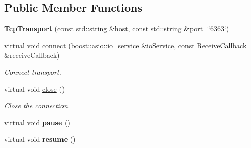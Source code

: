 \subsection*{Public Member Functions}
\begin{DoxyCompactItemize}
\item 
{\bfseries Tcp\+Transport} (const std\+::string \&host, const std\+::string \&port=\char`\"{}6363\char`\"{})\hypertarget{classndn_1_1TcpTransport_a1f88e912c3ced924c37390d25ef7d8a8}{}\label{classndn_1_1TcpTransport_a1f88e912c3ced924c37390d25ef7d8a8}

\item 
virtual void \hyperlink{classndn_1_1TcpTransport_ad8f8e670980297f940d9b73b4d0ae0df}{connect} (boost\+::asio\+::io\+\_\+service \&io\+Service, const Receive\+Callback \&receive\+Callback)
\begin{DoxyCompactList}\small\item\em Connect transport. \end{DoxyCompactList}\item 
virtual void \hyperlink{classndn_1_1TcpTransport_a0e692d8e563726c20166b11a664aeb35}{close} ()\hypertarget{classndn_1_1TcpTransport_a0e692d8e563726c20166b11a664aeb35}{}\label{classndn_1_1TcpTransport_a0e692d8e563726c20166b11a664aeb35}

\begin{DoxyCompactList}\small\item\em Close the connection. \end{DoxyCompactList}\item 
virtual void {\bfseries pause} ()\hypertarget{classndn_1_1TcpTransport_a8de59ccdd068a4c21449ac5d6a9644d9}{}\label{classndn_1_1TcpTransport_a8de59ccdd068a4c21449ac5d6a9644d9}

\item 
virtual void {\bfseries resume} ()\hypertarget{classndn_1_1TcpTransport_af5e251ffe96f23c025a8b07553e3cea1}{}\label{classndn_1_1TcpTransport_af5e251ffe96f23c025a8b07553e3cea1}


\end{DoxyCompactItemize}
